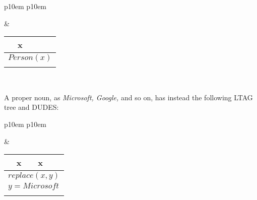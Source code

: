 \medskip
\begin{center}
\begin{tabular}{ p{10em} p{10em} }
	\label{tbl:grammar.people}
	
	\begin{center}
		\begin{tikzpicture}
		\Tree [.NP people ]
		\end{tikzpicture}
	\end{center}
		
	&
	
	\begin{center}
		\begin{tabular}{|c|l|}
			\hline
			x & \mbox{}\\ 
			\hline
			\multicolumn{2}{|l|}{
				$Person(x)$
			} \\
			\hline
			\multicolumn{2}{|l|}{
				\mbox{}
			} \\
			\hline
		\end{tabular}
	\end{center}	
	\\
\end{tabular}
\end{center}
\medskip

A proper noun, as \textit{Microsoft, Google,} and so on, has instead the following LTAG tree and DUDES:
 
\medskip
\begin{center}
\begin{tabular}{ p{10em} p{10em} }
	\label{tbl:grammar.microsoft}
	
	\begin{center}
		\begin{tikzpicture}
		\Tree [.DP Microsoft ]
		\end{tikzpicture}
	\end{center}
		
	&
	
	\begin{center}
		\begin{tabular}{|c|l|}
			\hline
			x & x\\ 
			\hline
			\multicolumn{2}{|l|}{
				$replace(x,y)$
			} \\
			\multicolumn{2}{|l|}{
				$y=Microsoft$
			} \\

			\hline
			\multicolumn{2}{|l|}{
				\mbox{}
			} \\
			\hline
		\end{tabular}
	\end{center}	
	\\
\end{tabular}
\end{center}
\medskip

